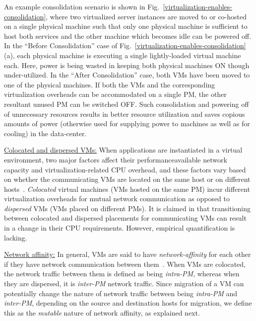 An example consolidation scenario is shown in Fig.~\ref{virtualization-enables-consolidation}, 
where two virtualized server instances are moved to or co-hosted on a single physical machine 
such that only one physical machine is sufficient to host both services and
the other machine which becomes idle can be powered off.
In the ``Before Consolidation'' case of Fig.~\ref{virtualization-enables-consolidation}(a), 
each physical machine is executing a single lightly-loaded virtual machine each. 
Here, power is being wasted in keeping both physical
machines ON though under-utilized. In the ``After Consolidation'' case,
both VMs have been moved to one of the physical machines. 
If both the VMs and the corresponding virtualization overheads can be accommodated
on a single PM,
the other resultant unused PM can be switched OFF. Such consolidation and
powering off of unnecessary resources results in better resource
utilization and saves copious amounts of power
(otherwise used for supplying power to machines as well as for cooling) in
the data-center.

\underline{Colocated and dispersed VMs:} When applications are 
instantiated in a virtual
environment, two major factors affect their performance\textemdash{}available
network capacity and virtualization-related CPU overhead,
and these factors vary based on whether the communicating VMs
are located on the same host or on different hosts~\cite{virtual-putty}.
\emph{Colocated} 
virtual machines (VMs 
hosted on the same PM) incur 
different virtualization overheads for mutual network
communication as opposed to \emph{dispersed} VMs 
(VMs placed on different PMs).
It is claimed in \cite{virtual-putty} that transitioning
between colocated and dispersed placements for communicating VMs
can result in a change in their CPU requirements. However, empirical
quantification is lacking.

\underline{Network affinity:} In general, VMs are said to have
\textit{network-affinity}
for each other if they have 
network communication between them~\cite{virtual-putty, starling}.
When VMs are colocated, the network traffic between them
is defined as being \textit{intra-PM}, whereas when they are dispersed,
it is \textit{inter-PM} network traffic.
Since migration of a VM can potentially change the nature of network
traffic between being \textit{intra-PM} and \textit{inter-PM}, depending 
on the source and destination hosts for migration, we define this
as the \textit{mutable} nature of network affinity, as explained next.

